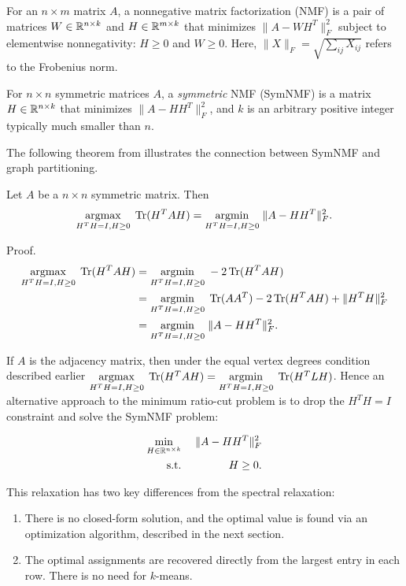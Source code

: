 For an $n \times m$ matrix $A$, a nonnegative matrix factorization
(NMF) is a pair of matrices $W \in \mathbb{R}^{n \times k}$ and
$H \in \mathbb{R}^{m \times k}$ that minimizes $\| A - W H^T \|_F^2$
subject to elementwise nonnegativity: $H \geq 0$ and $W \geq 0$.
Here, $\|X\|_F = \sqrt{\sum_{ij} X_{ij}}$ refers to the Frobenius norm.

For $n \times n$ symmetric matrices $A$, a \textit{symmetric} NMF
(SymNMF) is a matrix $H \in \mathbb{R}^{n \times k}$ that minimizes
$\| A - H H^T \|_F^2$, and $k$ is an arbitrary positive integer
typically much smaller than $n$.

The following theorem from \cite{Ding:05} illustrates the connection
between SymNMF and graph partitioning.

\begin{theorem}
Let $A$ be a $n \times n$ symmetric matrix. Then
\[ \underset{H^T H = I, H \geq 0}{\mathrm{arg max}}\; \operatorname{Tr}(H^T A H)
 = \underset{H^T H = I, H \geq 0}{\mathrm{arg min}}\; \| A - H H^T \|_F^2. \]

Proof. \begin{align*}
   \underset{H^T H = I, H \geq 0}{\mathrm{arg max}}\; \operatorname{Tr}(H^T A H)
&= \underset{H^T H = I, H \geq 0}{\mathrm{arg min}}\; -2 \operatorname{Tr}(H^T A H) \\
&= \underset{H^T H = I, H \geq 0}{\mathrm{arg min}}\; \operatorname{Tr}(A A^T) - 2 \operatorname{Tr}(H^T A H)
                                + \|H^T H\|_F^2 \\
&= \underset{H^T H = I, H \geq 0}{\mathrm{arg min}}\; \|A - H H^T\|_F^2.
\end{align*}
\end{theorem}

If $A$ is the adjacency matrix, then under the equal vertex degrees
condition described earlier
$ \underset{H^T H = I, H \geq 0}{\mathrm{arg max}}\; \operatorname{Tr}(H^T A H)
= \underset{H^T H = I, H \geq 0}{\mathrm{arg min}}\; \operatorname{Tr}(H^T L H)$.
Hence an alternative approach to the minimum ratio-cut problem
is to drop the $H^T H = I$ constraint and solve the SymNMF problem:

\begin{equation} \label{sym_nmf}
\begin{aligned}
\min_{H \in \mathbb{R}^{n \times k}} &\;& \|A - H H^T\|_F^2 \\
\text{s.t.}                  &\;& H \geq 0.         \\
\end{aligned}
\end{equation}

This relaxation has two key differences from the spectral relaxation:
\begin{enumerate}
\item
There is no closed-form solution, and the optimal value is found
via an optimization algorithm, described in the next section.

\item
The optimal assignments are recovered directly from the largest
entry in each row. There is no need for $k$-means.
\end{enumerate}

